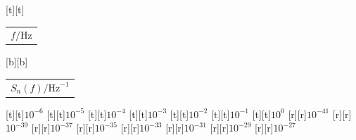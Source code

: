 %    
%
%
\begin{psfrags}%
\psfragscanon%
%
[t][t]{\color[rgb]{0,0,0}\setlength{\tabcolsep}{0pt}\begin{tabular}{c}{\Large $f/\mathrm{Hz}$}\end{tabular}}%
[b][b]{\color[rgb]{0,0,0}\setlength{\tabcolsep}{0pt}\begin{tabular}{c}{\Large $S_{n}(f)/\mathrm{Hz}^{-1}$\vspace{2.5mm}}\end{tabular}}%
%
[t][t]{$10^{-6}$}%
[t][t]{$10^{-5}$}%
[t][t]{$10^{-4}$}%
[t][t]{$10^{-3}$}%
[t][t]{$10^{-2}$}%
[t][t]{$10^{-1}$}%
[t][t]{$10^{0}$}%
%
[r][r]{$10^{-41}$}%
[r][r]{$10^{-39}$}%
[r][r]{$10^{-37}$}%
[r][r]{$10^{-35}$}%
[r][r]{$10^{-33}$}%
[r][r]{$10^{-31}$}%
[r][r]{$10^{-29}$}%
[r][r]{$10^{-27}$}%
%
%
\end{psfrags}%
%

